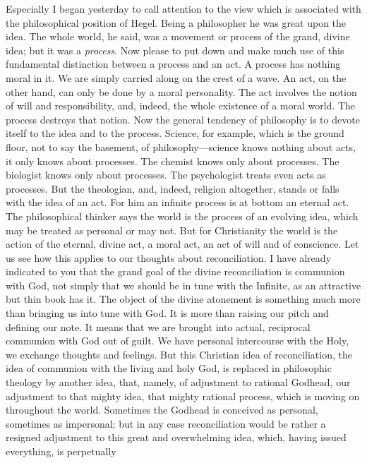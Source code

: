 \documentclass[12pt,letterpaper,oneside]{book}
\begin{document}
Especially I began yesterday to call attention 
to the view which is associated with the philosophical 
position of Hegel. Being a philosopher 
he was great upon the idea. The whole world, 
he said, was a movement or process of the grand, 
divine idea; but it was a \textit{process}. Now please 
to put down and make much use of this fundamental 
distinction between a process and an 
act. A process has nothing moral in it. We 
are simply carried along on the crest of a wave. 
An act, on the other hand, can only be done by 
a moral personality. The act involves the notion 
of will and responsibility, and, indeed, the whole 
existence of a moral world. The process destroys 
that notion. Now the general tendency of 
philosophy is to devote itself to the idea and 
to the process. Science, for example, which is 
the ground floor, not to say the basement, of 
philosophy---science knows nothing about acts, 
it only knows about processes. The chemist 
knows only about processes. The biologist 
knows only about processes. The psychologist 
treats even acts as processes. But the theologian, 
and, indeed, religion altogether, stands 
or falls with the idea of an act. For him an 
infinite process is at bottom an eternal act. The 
philosophical thinker says the world is the process 
of an evolving idea, which may be treated as 
personal or may not. But for Christianity the 
world is the action of the eternal, divine act, 
a moral act, an act of will and of conscience. 
Let us see how this applies to our thoughts 
about reconciliation. I have already indicated 
to you that the grand goal of the divine reconciliation 
is communion with God, not simply 
that we should be in tune with the Infinite, 
as an attractive but thin book has it. The 
object of the divine atonement is something 
much more than bringing us into tune with 
God. It is more than raising our pitch and 
defining our note. It means that we are 
brought into actual, reciprocal communion with 
God out of guilt. We have personal intercourse 
with the Holy, we exchange thoughts and feelings. 
But this Christian idea of reconciliation, 
the idea of communion with the living and 
holy God, is replaced in philosophic theology by 
another idea, that, namely, of adjustment to 
rational Godhead, our adjustment to that 
mighty idea, that mighty rational process, 
which is moving on throughout the world. 
Sometimes the Godhead is conceived as personal, 
sometimes as impersonal; but in any case 
reconciliation would be rather a resigned adjustment 
to this great and overwhelming idea, 
which, having issued everything, is perpetually 
\end{document}
